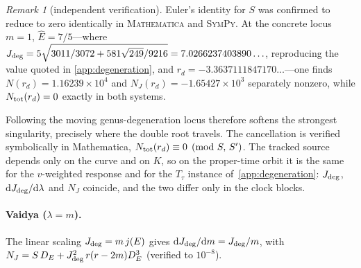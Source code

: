 \documentclass[12pt]{iopart}
\newcommand{\Ehat}{\hat E}
\newcommand{\Jc}{J_{\rm deg}}
\newcommand{\dd}{\mathrm{d}}
\theoremstyle{plain}
\theoremstyle{definition}
\theoremstyle{plain}
\theoremstyle{remark}
\newtheorem*{remark}{Remark}
\begin{document}
\begin{remark}[independent verification]
Euler's identity for $S$ was confirmed to reduce to zero identically in
\textsc{Mathematica} and \textsc{SymPy}. At the concrete locus $m=1$, $\Ehat=7/5$---where
$\Jc=5\sqrt{3011/3072+581\sqrt{249}/9216}=7.0266237403890\ldots$, reproducing the value
quoted in \ref{app:degeneration}, and $r_d=-3.3637111847170\ldots$---one finds
$N(r_d)=1.16239\times10^{4}$ and $N_J(r_d)=-1.65427\times10^{3}$ separately nonzero, while
$N_{\rm tot}(r_d)=0$ exactly in both systems.
\end{remark}

Following the moving genus-degeneration locus therefore softens the strongest
singularity, precisely where the double root travels. The cancellation is verified
symbolically in Mathematica, $N_{\rm tot}(r_d)\equiv0\pmod{S,\,S'}$. The tracked
source depends only on the curve and on $K$, so on the proper-time orbit it is the same
for the $v$-weighted response and for the $T_\tau$ instance of~\ref{app:degeneration}:
$\Jc$, $\dd\Jc/\dd\lambda$ and $N_J$ coincide, and the two differ only in the clock
blocks.

\paragraph{Vaidya ($\lambda=m$).}
The linear scaling $\Jc=m\,j(E)$ gives $\dd\Jc/\dd m=\Jc/m$, with
$N_J=S\,D_E+\Jc^2\,r(r-2m)D_E^3$ (verified to $10^{-8}$).
\end{document}
